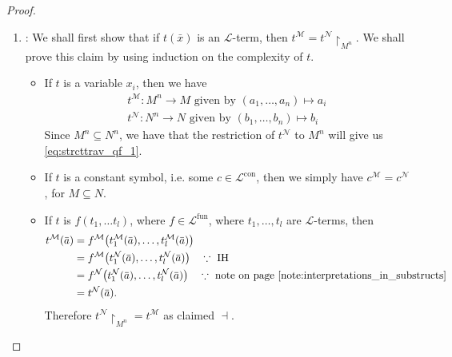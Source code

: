 \documentclass[notoc,notitlepage]{tufte-book}
\DeclareMathOperator{\con}{con}
\DeclareMathOperator{\fun}{fun}
\begin{document}
\begin{proof}
  \begin{enumerate}
    \item {}: We shall first show that if $t(\bar{x})$ is an $\mathcal{L}$-term, then $t^\mathcal{M} = t^\mathcal{N} \restriction_{M^n}$. We shall prove this claim by using induction on the complexity of $t$.
      \begin{itemize}
        \item If $t$ is a variable $x_i$, then we have
          \begin{gather}
            t^\mathcal{M} : M^n \to M \text{ given by } (a_1, \ldots, a_n) \mapsto a_i \label{eq:strcttrav_qf_1}\\
            t^\mathcal{N} : N^n \to N \text{ given by } (b_1, \ldots, b_n) \mapsto b_i \nonumber
          \end{gather}
          Since $M^n \subseteq N^n$, we have that the restriction of $t^\mathcal{N}$ to $M^n$ will give us \eqref{eq:strcttrav_qf_1}.
        \item If $t$ is a constant symbol, i.e. some $c \in \mathcal{L}^{\con}$, then we simply have $c^\mathcal{M} = c^\mathcal{N}$, for $M \subseteq N$.
        \item If $t$ is $f(t_1, \ldots t_l)$, where $f \in \mathcal{L}^{\fun}$, where $t_1, \ldots, t_l$ are $\mathcal{L}$-terms, then
          \begin{align*}
            t^\mathcal{M}(\bar{a}) &= f^\mathcal{M} \big( t_1^\mathcal{M}(\bar{a}), \ldots, t_l^\mathcal{M}(\bar{a}) \big) \\
                                   &= f^\mathcal{M} \big( t_1^\mathcal{N}(\bar{a}), \ldots, t_l^\mathcal{N}(\bar{a}) \big) \quad \because \text{ IH } \\
                                   &= f^\mathcal{N} \big( t_1^\mathcal{N}(\bar{a}), \ldots, t_l^\mathcal{N}(\bar{a}) \big) \quad \because \text{ note on page } \pageref{note:interpretations_in_substructs} \\
                                   &= t^\mathcal{N} (\bar{a}).
          \end{align*}
          Therefore $t^\mathcal{N} \restriction_{M^n} = t^\mathcal{M}$ as claimed $\dashv$.


\end{itemize}
\end{enumerate}
\end{proof}
\end{document}
